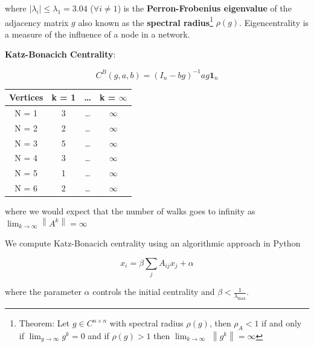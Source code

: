\documentclass[a4paper]{article}
\begin{document}
where $|\lambda_i| \le \lambda_1 = 3.04$ ($\forall i\ne 1$) is the \textbf{Perron-Frobenius eigenvalue} of the adjacency matrix $g$ also known as the \textbf{spectral radius}\footnote{Theorem: Let $g \in C^{n\times n}$ with spectral radius $\rho(g)$, then $\rho_A < 1$ if and only if $\lim_{g\to\infty} g^k = 0$ and if $\rho(g) > 1$ then $\lim_{k\to\infty}$  $\left\| g^k \right\| = \infty$  } $\rho(g)$. Eigencentrality is a measure of the influence of a node in a network. 

\vspace{3cm}
\noindent \textbf{{\color{blue} Katz-Bonacich Centrality}}:

\begin{equation}
C^B(g,a,b) = (I_n - bg)^{-1}ag\textbf{1}_n
\end{equation}

\begin{table}[ht!]
	\centering
	 \label{tab:title} 
	\begin{tabular}{cccc}
		
		Vertices &  k = 1 & \dots & k = $\infty$\\
		\hline\hline
		N = 1 & 3 & \dots &  $\infty$ \\
		N = 2 & 2 & \dots &  $\infty$ \\
		N = 3 & 5 & \dots &  $\infty$ \\
		N = 4 & 3 & \dots &  $\infty$\\
		N = 5 & 1 & \dots &  $\infty$ \\
		N = 6 & 2 & \dots &  $\infty$ \\

		\bottomrule[1pt]
	\end{tabular}
\end{table}

where we would expect that the number of walks goes to infinity as $\lim_{k\to\infty} \left\| A^k \right\| = \infty$

\noindent We compute Katz-Bonacich centrality using an algorithmic approach in Python

\begin{equation}
x_i = \beta \sum_j A_{ij}x_j + \alpha
\end{equation}

where the parameter $\alpha$ controls the initial centrality and $\beta < \frac{1}{\lambda_{\text{max}}}$. 
\end{document}
